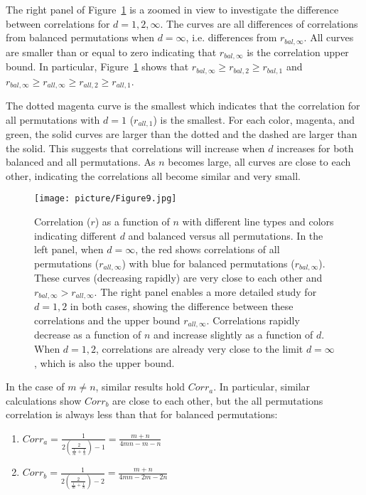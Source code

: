 \documentclass[12pt]{article}
\begin{document}
\begin{appendices}
The right panel of Figure~\ref{3} is a zoomed in view to investigate the difference between correlations for $d=1,2,\infty$. The curves are all differences of correlations from balanced permutations when $d=\infty$, i.e. differences from $r_{bal, \infty}$. All curves are smaller than or equal to zero indicating that $r_{bal, \infty}$ is the correlation upper bound. In particular, Figure~\ref{3} shows that $r_{bal, \infty}\ge r_{bal, 2}\ge r_{bal, 1}$ and $r_{bal, \infty}\ge r_{all, \infty}\ge r_{all, 2}\ge r_{all, 1}$. 

The dotted magenta curve is the smallest which indicates that the correlation for all permutations with $d=1$ ($r_{all,1}$) is the smallest. For each color, magenta, and green, the solid curves are larger than the dotted and the dashed are larger than the solid. This suggests that correlations will increase when $d$ increases for both balanced and all permutations. As $n$ becomes large, all curves are close to each other, indicating the correlations all become similar and very small. 
\begin{figure}%
  \centering
  \texttt{[image: picture/Figure9.jpg]}\\
  \caption{Correlation ($r$) as a function of $n$ with different line types and colors indicating different $d$ and balanced versus all permutations. In the left panel, when $d=\infty$, the red shows correlations of all permutations ($r_{all, \infty}$) with blue for balanced permutations ($r_{bal, \infty}$). These curves (decreasing rapidly) are very close to each other and $r_{bal, \infty}>r_{all, \infty}$. The right panel 
enables a more detailed study for $d=1,2$ in both cases, showing the difference between these correlations and the upper bound $r_{all, \infty}$. Correlations rapidly decrease as a function of $n$ and increase slightly as a function of $d$. When $d=1,2$, correlations are already very close to the limit $d=\infty$, which is also the upper bound. }
  \label{3}
\end{figure}

In the case of $m\ne n$, similar results hold $Corr_a$.  In particular, similar calculations show $Corr_b$ are close to each other, but the all permutations correlation is always less than that for balanced permutations:
\begin{enumerate}
\item $Corr_a=\frac{1}{2(\frac{2}{\frac{1}{m}+\frac{1}{n}})-1}=\frac{m+n}{4mn-m-n}$
\item $Corr_b=\frac{1}{2(\frac{2}{\frac{1}{m}+\frac{1}{n}})-2}=\frac{m+n}{4mn-2m-2n}$
\end{enumerate}


\end{appendices}
\end{document}
